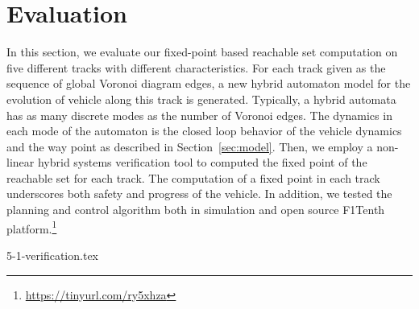 \section{Evaluation}
In this section, we evaluate our fixed-point based reachable set computation on five different tracks with different characteristics. 
%
For each track given as the sequence of global Voronoi diagram edges, a new hybrid automaton model for the evolution of vehicle along this track is generated. Typically, a hybrid automata has as many discrete modes as the number of Voronoi edges. 
%
The dynamics in each mode of the  automaton is the closed loop behavior of the vehicle dynamics and the way point as described in Section~\ref{sec:model}.
%
Then, we employ a non-linear hybrid systems verification tool to computed the fixed point of the reachable set for each track.
%
The computation of a fixed point in each track underscores both safety and progress of the vehicle.
%
In addition, we tested the planning and control algorithm both in simulation and open source F1Tenth platform.\footnote{\url{https://tinyurl.com/ry5xhza}}

{5-1-verification.tex}
